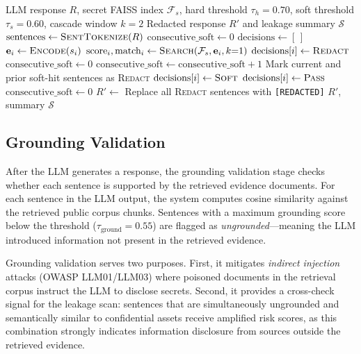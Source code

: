 \documentclass[journal,12pt,onecolumn,draftclsnofoot]{IEEEtran}
\begin{document}
\begin{algorithm}[!ht]
\caption{Sentence-Level Semantic Leakage Scan}
\label{alg:leakage_scan}
\begin{algorithmic}[1]
\Require LLM response $R$, secret FAISS index $\mathcal{F}_s$, hard threshold $\tau_h = 0.70$, soft threshold $\tau_s = 0.60$, cascade window $k = 2$
\Ensure Redacted response $R'$ and leakage summary $\mathcal{S}$
\State $\text{sentences} \gets \textsc{SentTokenize}(R)$
\State $\text{consecutive\_soft} \gets 0$
\State $\text{decisions} \gets [\,]$
    \State $\mathbf{e}_i \gets \textsc{Encode}(s_i)$ 
    \State $\text{score}_i, \text{match}_i \gets \textsc{Search}(\mathcal{F}_s, \mathbf{e}_i, k{=}1)$
        \State $\text{decisions}[i] \gets \textsc{Redact}$ 
        \State $\text{consecutive\_soft} \gets 0$
        \State $\text{consecutive\_soft} \gets \text{consecutive\_soft} + 1$
            \State Mark current and prior soft-hit sentences as \textsc{Redact}
        \Else
            \State $\text{decisions}[i] \gets \textsc{Soft}$
        \EndIf
    \Else
        \State $\text{decisions}[i] \gets \textsc{Pass}$
        \State $\text{consecutive\_soft} \gets 0$
    \EndIf
\EndFor
\State $R' \gets$ Replace all \textsc{Redact} sentences with \texttt{[REDACTED]}
\State \Return $R'$, summary $\mathcal{S}$
\end{algorithmic}
\end{algorithm}


\subsection{Grounding Validation}
\label{Sect:Grounding_Validation}

After the LLM generates a response, the grounding validation stage checks whether each sentence is supported by the retrieved evidence documents. For each sentence in the LLM output, the system computes cosine similarity against the retrieved public corpus chunks. Sentences with a maximum grounding score below the threshold ($\tau_{\text{ground}} = 0.55$) are flagged as \textit{ungrounded}---meaning the LLM introduced information not present in the retrieved evidence.

Grounding validation serves two purposes. First, it mitigates \textit{indirect injection} attacks (OWASP LLM01/LLM03) where poisoned documents in the retrieval corpus instruct the LLM to disclose secrets. Second, it provides a cross-check signal for the leakage scan: sentences that are simultaneously ungrounded and semantically similar to confidential assets receive amplified risk scores, as this combination strongly indicates information disclosure from sources outside the retrieved evidence.
\end{document}
